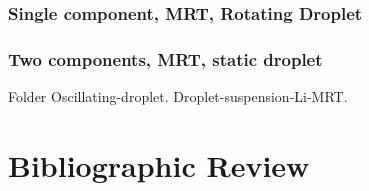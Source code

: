 \documentclass{article}
\begin{document}
	\subsubsection{Single component, MRT, Rotating Droplet}
	
	\subsubsection{Two components, MRT, static droplet}
	Folder Oscillating-droplet. Droplet-suspension-Li-MRT.
	
	\section{Bibliographic Review}


	
	
	
	
\end{document}
